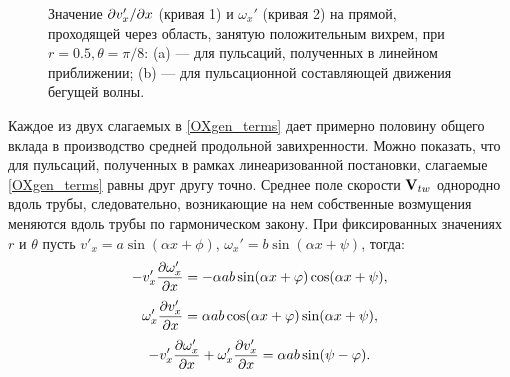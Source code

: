 \begin{figure}
\caption{Значение $\partial v_x' /\partial x$ (кривая 1) и $\omega_x'$ (кривая 2) на прямой, проходящей через область, занятую положительным вихрем, при $r = 0.5, \theta = \pi/8$: (a) --- для пульсаций, полученных в линейном приближении; (b) --- для пульсационной составляющей движения бегущей волны. }
\label{OXgen_corr_pic}
\end{figure}


Каждое из двух слагаемых в \eqref{OXgen_terms} дает примерно половину общего вклада в производство средней продольной завихренности. Можно показать, что для пульсаций, полученных в рамках линеаризованной постановки, слагаемые \eqref{OXgen_terms} равны друг другу точно. Среднее поле скорости $\mathbf{V}_{tw}$ однородно вдоль трубы, следовательно, возникающие на нем собственные возмущения меняются вдоль трубы по гармоническом закону. При фиксированных значениях $r$ и $\theta$ пусть  $v'_x = a \sin(\alpha x + \phi)$, $\omega_x' = b \sin(\alpha x + \psi)$, тогда:
\begin{equation} \label{OXgen_iterms_1}
 - v'_x \frac{\partial \omega'_x}{\partial x} = - \alpha a b \sin(\alpha x + \varphi) \cos(\alpha x + \psi),
\end{equation}
\begin{equation} \label{OXgen_iterms_2}
\omega'_x \frac{\partial v'_x}{\partial x} =  \alpha a b \cos(\alpha x + \varphi) \sin(\alpha x + \psi),
\end{equation}
\begin{equation} \label{OXgen_iterms_sum}
 - v'_x \frac{\partial \omega'_x}{\partial x} + \omega'_x \frac{\partial v'_x}{\partial x} = \alpha a b \sin(\psi - \varphi).
\end{equation}

